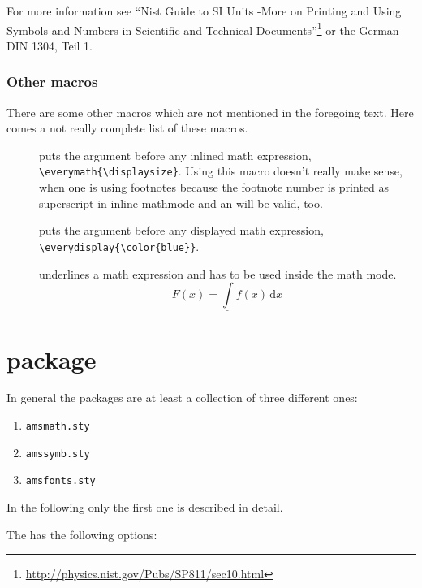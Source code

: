 \begin{table}[htb]
For more information see ``Nist Guide to SI Units -More on Printing and Using Symbols and
Numbers in Scientific and
Technical Documents''\footnote{\url{http://physics.nist.gov/Pubs/SP811/sec10.html}} or
the German DIN 1304, Teil 1.


\section{Other macros}\label{sec:other}
%
There are some other macros which are not mentioned in the foregoing text. Here comes
a not really complete list of these macros.
\begin{description}
\item[]  puts the argument before
any inlined math expression, \eg \verb+\everymath{\displaysize}+. Using this macro doesn't really
make sense, when one is using footnotes because the footnote number is printed as superscript in
inline mathmode and an  will be valid, too.
\item[]  puts  the
argument before any displayed math expression, \eg \verb+\everydisplay{\color{blue}}+.
\item[]  underlines a math
expression and has to be used inside the math mode.
\[
\underline{F(x)=\int f(x)\,\mathrm{d}x}
\]
\end{description}



\part{\texorpdfstring{\AmSmath}{amsmath} package}\label{par:AMSmath-package}

In general the \AmS packages are at least a collection of three different ones:
\begin{enumerate}
\item \verb|amsmath.sty|
\item \verb|amssymb.sty|
\item \verb|amsfonts.sty|
\end{enumerate}
In the following only the first one is described in detail.

The \AmSmath has the following options:


\end{table}
